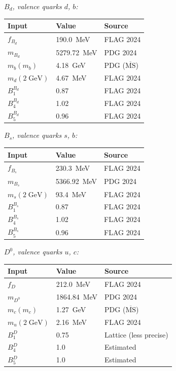 \documentclass[11pt]{article}
\begin{document}
\noindent\emph{$B_d$, valence quarks $d$, $b$:}

\begin{table}[h]
\centering
\begin{tabular}{@{}lll@{}}
\toprule
Input & Value & Source \\
\midrule
$f_{B_d}$ & 190.0~MeV & FLAG 2024 \\
$m_{B_d}$ & 5279.72~MeV & PDG 2024 \\
$m_b(m_b)$ & 4.18~GeV & PDG ($\overline{\mathrm{MS}}$) \\
$m_d(2\;\text{GeV})$ & 4.67~MeV & FLAG 2024 \\
$B_1^{B_d}$ & 0.87 & FLAG 2024 \\
$B_4^{B_d}$ & 1.02 & FLAG 2024 \\
$B_5^{B_d}$ & 0.96 & FLAG 2024 \\
\bottomrule
\end{tabular}
\end{table}

\noindent\emph{$B_s$, valence quarks $s$, $b$:}

\begin{table}[h]
\centering
\begin{tabular}{@{}lll@{}}
\toprule
Input & Value & Source \\
\midrule
$f_{B_s}$ & 230.3~MeV & FLAG 2024 \\
$m_{B_s}$ & 5366.92~MeV & PDG 2024 \\
$m_s(2\;\text{GeV})$ & 93.4~MeV & FLAG 2024 \\
$B_1^{B_s}$ & 0.87 & FLAG 2024 \\
$B_4^{B_s}$ & 1.02 & FLAG 2024 \\
$B_5^{B_s}$ & 0.96 & FLAG 2024 \\
\bottomrule
\end{tabular}
\end{table}

\noindent\emph{$D^0$, valence quarks $u$, $c$:}

\begin{table}[h]
\centering
\begin{tabular}{@{}lll@{}}
\toprule
Input & Value & Source \\
\midrule
$f_D$ & 212.0~MeV & FLAG 2024 \\
$m_{D^0}$ & 1864.84~MeV & PDG 2024 \\
$m_c(m_c)$ & 1.27~GeV & PDG ($\overline{\mathrm{MS}}$) \\
$m_u(2\;\text{GeV})$ & 2.16~MeV & FLAG 2024 \\
$B_1^D$ & 0.75 & Lattice (less precise) \\
$B_4^D$ & 1.0 & Estimated \\
$B_5^D$ & 1.0 & Estimated \\
\bottomrule
\end{tabular}
\end{table}
\end{document}
